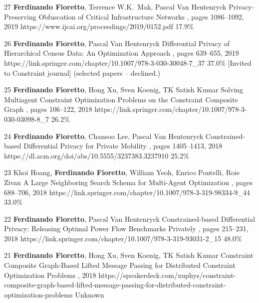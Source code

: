\begin{pubs}
	\confentry
		{27} %
		{{\bf Ferdinando Fioretto}, Terrence W.K.~Mak, Pascal Van Hentenryck}
		{Privacy-Preserving Obfuscation of Critical Infrastructure Networks}
	  	{\procIJCAI, pages 1086--1092, 2019}
	  	{https://www.ijcai.org/proceedings/2019/0152.pdf}
	    {17.9\%} %

	\confentryAwd
		{26} %
		{{\bf Ferdinando Fioretto}, Pascal Van Hentenryck}
		{Differential Privacy of Hierarchical Census Data: An Optimization Approach} 
		{\procCP, pages 639--655, 2019}
		{https://link.springer.com/chapter/10.1007/978-3-030-30048-7\_37}
		{37.0\%}
		{[Invited to Constraint journal]}
		{(selected papers -- declined.)}

\confentry 
		{25} %
		{{\bf Ferdinando Fioretto}, Hong Xu, Sven Koenig, TK Satish Kumar}
	 	{Solving Multiagent Constraint Optimization Problems on the Constraint Composite Graph}
		{\procPRIMA, pages 106--122, 2018}
		{https://link.springer.com/chapter/10.1007/978-3-030-03098-8\_7}
	    {26.2\%} %

	\confentry
		{24} %
	  	{{\bf Ferdinando Fioretto}, Chansoo Lee, Pascal Van Hentenryck}
	  	{Constrained-based Differential Privacy for Private Mobility} 
	  	{\procAAMAS, pages 1405--1413, 2018}
	  	{https://dl.acm.org/doi/abs/10.5555/3237383.3237910}
	    {25.2\%} %

	\confentry 
		{23} %
		{Khoi Hoang, {\bf Ferdinando Fioretto}, William Yeoh, Enrico Pontelli, Roie Zivan}
		{A Large Neighboring Search Schema for Multi-Agent Optimization}
		{\procCP, pages 688--706, 2018}
		{https://link.springer.com/chapter/10.1007/978-3-319-98334-9\_44}
	    {33.0\%} %

	\confentry 
		{22} %
		{{\bf Ferdinando Fioretto}, Pascal Van Hentenryck}
		{Constrained-based Differential Privacy: Releasing Optimal Power Flow Benchmarks Privately} 
		{\procCPAIOR, pages 215--231, 2018}
		{https://link.springer.com/chapter/10.1007/978-3-319-93031-2\_15}
	    {48.0\%}

	\confentry
		{21} %
		{{\bf Ferdinando Fioretto}, Hong Xu, Sven Koenig, TK Satish Kumar}
		{Constraint Composite Graph-Based Lifted Message Passing for Distributed Constraint Optimization Problems}
		{\procISIAM, 2018}
		{https://speakerdeck.com/xuphys/constraint-composite-graph-based-lifted-message-passing-for-distributed-constraint-optimization-problems}
		{Unknown}


\end{pubs}

